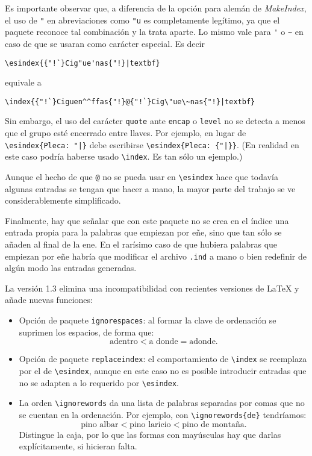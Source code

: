 \documentclass{article}
\begin{document}
Es importante observar que, a diferencia de la opción para alemán de
\textit{MakeIndex}, el uso de \verb|"| en abreviaciones como \verb|"u|
es completamente legítimo, ya que el paquete reconoce tal combinación y
la trata aparte. Lo mismo vale para \verb|'| o \verb|~| en caso de que
se usaran como carácter especial. Es decir
\begin{verbatim}
\esindex{{"!`}Cig"ue'nas{"!}|textbf}
\end{verbatim}
equivale a
\begin{verbatim}
\index{{"!`}Ciguen^^ffas{"!}@{"!`}Cig\"ue\~nas{"!}|textbf}
\end{verbatim}

Sin embargo, el uso del carácter \verb|quote| ante \verb|encap| o
\verb|level| no se detecta a menos que el grupo esté encerrado entre
llaves. Por ejemplo, en lugar de \verb/\esindex{Pleca: "|}/ debe
escribirse \verb/\esindex{Pleca: {"|}}/. (En realidad en este caso
podría haberse usado \verb|\index|. Es tan sólo un ejemplo.)

Aunque el hecho de que \verb|@| no se pueda usar en \verb|\esindex|
hace que todavía algunas entradas se tengan que hacer a mano, la mayor
parte del trabajo se ve considerablemente simplificado.

Finalmente, hay que señalar que con este paquete no se crea en el
índice una entrada propia para la palabras que empiezan por eñe, sino
que tan sólo se añaden al final de la ene. En el rarísimo caso de que
hubiera palabras que empiezan por eñe habría que modificar el archivo
\verb|.ind| a mano o bien redefinir de algún modo las entradas
generadas.

La versión 1.3 elimina una incompatibilidad con recientes versiones de
\LaTeX{} y añade nuevas funciones:
\begin{itemize}
\item Opción de paquete \verb|ignorespaces|: al formar la clave de 
ordenación se suprimen los espacios, de forma que:
$$\mbox{adentro} < \mbox{a donde} = \mbox{adonde}.$$
\item Opción de paquete \verb|replaceindex|: el comportamiento de
\verb|\index| se reemplaza por el de \verb|\esindex|, aunque en este
caso no es posible introducir entradas que no se adapten a lo
requerido por \verb|\esindex|.
\item La orden \verb|\ignorewords| da
una lista de palabras separadas por comas que no se cuentan en la
ordenación.  Por ejemplo, con \verb|\ignorewords{de}| tendríamos:
$$\mbox{pino albar} < \mbox{pino laricio} < \mbox{pino de montaña}.$$
Distingue la caja, por lo que las formas con mayúsculas hay que darlas
explícitamente, si hicieran falta.
\end{itemize}
\end{document}
